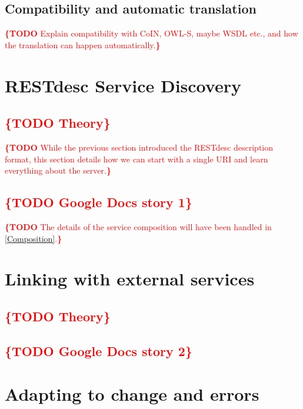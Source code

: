 \documentclass[runningheads,a4paper, twocolumn]{llncs}
\newcommand{\todo}[1]{\noindent\textcolor{red}{{\bf \{TODO} #1{\bf \}}}}
\begin{document}



\subsection{Compatibility and automatic translation}
\todo{Explain compatibility with CoIN, OWL-S, maybe WSDL etc., and how the translation can happen automatically.}


\section{RESTdesc Service Discovery}
\subsection{\todo{Theory}}
\todo{While the previous section introduced the RESTdesc description format, this section details how we can start with a single URI and learn everything about the server.}

\subsection{\todo{Google Docs story 1}}
\label{MainStory}
\todo{The details of the service composition will have been handled in \ref{Composition}.}


\section{Linking with external services}
\subsection{\todo{Theory}}
\subsection{\todo{Google Docs story 2}}


\section{Adapting to change and errors}
\end{document}
